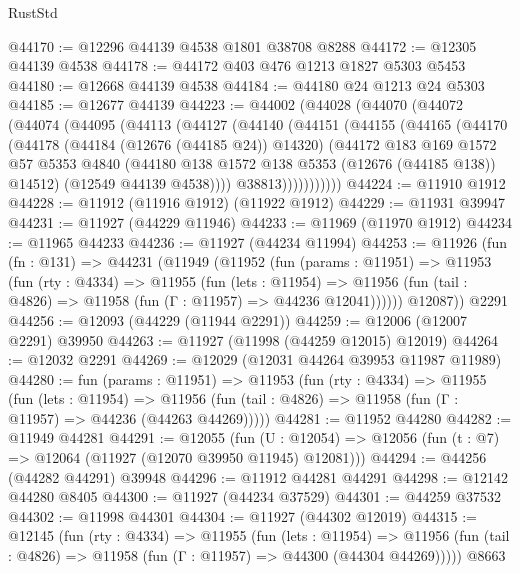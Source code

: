 \begin{lexlean}{RustStd}
\begin{coremodule}
@44170 := @12296 @44139 @4538 @1801 @38708 @8288
@44172 := @12305 @44139 @4538
@44178 := @44172 @403 @476 @1213 @1827 @5303 @5453
@44180 := @12668 @44139 @4538
@44184 := @44180 @24 @1213 @24 @5303
@44185 := @12677 @44139
@44223 := @44002
    (@44028
      (@44070
        (@44072
          (@44074
            (@44095
              (@44113
                (@44127
                  (@44140
                    (@44151
                      (@44155
                        (@44165
                          (@44170
                            (@44178
                              (@44184 (@12676 (@44185 @24)) @14320)
                              (@44172
                                @183
                                @169
                                @1572
                                @57
                                @5353
                                @4840
                                (@44180 @138 @1572 @138 @5353 (@12676 (@44185 @138)) @14512)
                                (@12549 @44139 @4538))))
                          @38813)))))))))))
@44224 := @11910 @1912
@44228 := @11912 (@11916 @1912) (@11922 @1912)
@44229 := @11931 @39947
@44231 := @11927 (@44229 @11946)
@44233 := @11969 (@11970 @1912)
@44234 := @11965 @44233
@44236 := @11927 (@44234 @11994)
@44253 := @11926
    (fun (fn : @131) =>
    @44231
      (@11949
        (@11952
          (fun (params : @11951) =>
          @11953
            (fun (rty : @4334) =>
            @11955
              (fun (lets : @11954) =>
              @11956 (fun (tail : @4826) => @11958 (fun (Γ : @11957) => @44236 @12041))))))
        @12087))
    @2291
@44256 := @12093 (@44229 (@11944 @2291))
@44259 := @12006 (@12007 @2291) @39950
@44263 := @11927 (@11998 (@44259 @12015) @12019)
@44264 := @12032 @2291
@44269 := @12029 (@12031 @44264 @39953 @11987 @11989)
@44280 := fun (params : @11951) =>
  @11953
    (fun (rty : @4334) =>
    @11955
      (fun (lets : @11954) =>
      @11956 (fun (tail : @4826) => @11958 (fun (Γ : @11957) => @44236 (@44263 @44269)))))
@44281 := @11952 @44280
@44282 := @11949 @44281
@44291 := @12055
    (fun (U : @12054) => @12056 (fun (t : @7) => @12064 (@11927 (@12070 @39950 @11945) @12081)))
@44294 := @44256 (@44282 @44291) @39948
@44296 := @11912 @44281 @44291
@44298 := @12142 @44280 @8405
@44300 := @11927 (@44234 @37529)
@44301 := @44259 @37532
@44302 := @11998 @44301
@44304 := @11927 (@44302 @12019)
@44315 := @12145
    (fun (rty : @4334) =>
    @11955
      (fun (lets : @11954) =>
      @11956 (fun (tail : @4826) => @11958 (fun (Γ : @11957) => @44300 (@44304 @44269)))))
    @8663

\end{coremodule}
\end{lexlean}
